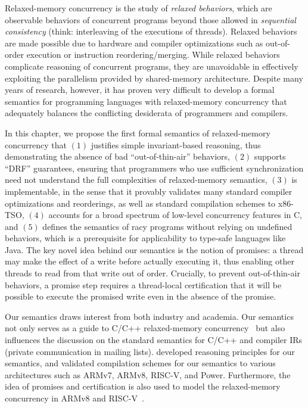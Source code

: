 Relaxed-memory concurrency is the study of \emph{relaxed behaviors}, which are observable behaviors
of concurrent programs beyond those allowed in \emph{sequential consistency} (think: interleaving of
the executions of threads).  Relaxed behaviors are made possible due to hardware and compiler
optimizations such as out-of-order execution or instruction reordering/merging.  While relaxed
behaviors complicate reasoning of concurrent programs, they are unavoidable in effectively
exploiting the parallelism provided by shared-memory architecture.  Despite many years of research,
however, it has proven very difficult to develop a formal semantics for programming languages with
relaxed-memory concurrency that adequately balances the conflicting desiderata of programmers and
compilers.

In this chapter, we propose the first formal semantics of relaxed-memory concurrency that $(1)$
justifies simple invariant-based reasoning, thus demonstrating the absence of bad
``out-of-thin-air'' behaviors, $(2)$ supports ``DRF'' guarantees, ensuring that programmers who use
sufficient synchronization need not understand the full complexities of relaxed-memory semantics,
$(3)$ is implementable, in the sense that it provably validates many standard compiler optimizations
and reorderings, as well as standard compilation schemes to x86-TSO, $(4)$ accounts for a broad
spectrum of low-level concurrency features in C, and $(5)$ defines the semantics of racy programs
without relying on undefined behaviors, which is a prerequisite for applicability to type-safe
languages like Java.  The key novel idea behind our semantics is the notion of promises: a thread
may make the effect of a write before actually executing it, thus enabling other threads to read
from that write out of order.  Crucially, to prevent out-of-thin-air behaviors, a promise step
requires a thread-local certification that it will be possible to execute the promised write even in
the absence of the promise.

Our semantics draws interest from both industry and academia.  Our semantics not only serves as a
guide to C/C++ relaxed-memory concurrency~\cite{blog,niko} but also influences the discussion on the
standard semantics for C/C++ and compiler IRs (private communication in mailing lists).
\cite{viktor-logic} developed reasoning principles for our semantics, and \cite{viktor-compilation}
validated compilation schemes for our semantics to various architectures such as ARMv7, ARMv8,
RISC-V, and Power.  Furthermore, the idea of promises and certification is also used to model the
relaxed-memory concurrency in ARMv8 and RISC-V~\cite{promising-armv8-riscv}.

